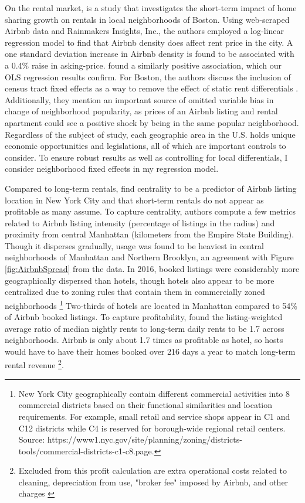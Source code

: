 \documentclass[12pt]{article}
\begin{document}
			\par
			On the rental market, \citet{horn2017home} is a study that investigates the short-term impact of home sharing growth on rentals in local neighborhoods of Boston. Using web-scraped Airbnb data and Rainmakers Insights, Inc., the authors employed a log-linear regression model to find that Airbnb density does affect rent price in the city. A one standard deviation increase in Airbnb density is found to be associated with a 0.4\% raise in asking-price. \citet{barron2018sharing} found a similarly positive association, which our OLS regression results confirm. For Boston, the authors discuss the inclusion of census tract fixed effects as a way to remove the effect of static rent differentials \citep{horn2017home}. Additionally, they mention an important source of omitted variable bias in change of neighborhood popularity, as prices of an Airbnb listing and rental apartment could see a positive shock by being in the same popular neighborhood. Regardless of the subject of study, each geographic area in the U.S. holds unique economic opportunities and legislations, all of which are important controls to consider. To ensure robust results as well as controlling for local differentials, I consider neighborhood fixed effects in my regression model.
			
			\par
			Compared to long-term rentals, \citet{coles2017airbnb} find centrality to be a predictor of Airbnb listing location in New York City and that short-term rentals do not appear as profitable as many assume. To capture centrality, authors compute a few metrics related to Airbnb listing intensity (percentage of listings in the radius) and proximity from central Manhattan (kilometers from the Empire State Building). Though it disperses gradually, usage was found to be heaviest in central neighborhoods of Manhattan and Northern Brooklyn, an agreement with Figure \ref{fig:AirbnbSpread} from the data. In 2016, booked listings were considerably more geographically dispersed than hotels, though hotels also appear to be more centralized due to zoning rules that contain them in commercially zoned neighborhoods \footnote{New York City geographically contain different commercial activities into 8 commercial districts based on their functional similarities and location requirements. For example, small retail and service shops appear in C1 and C12 districts while C4 is reserved for borough-wide regional retail centers. Source: https://www1.nyc.gov/site/planning/zoning/districts-tools/commercial-districts-c1-c8.page.} Two-thirds of hotels are located in Manhattan compared to 54\% of Airbnb booked listings. To capture profitability, \citet{coles2017airbnb} found the listing-weighted average ratio of median nightly rents to long-term daily rents to be 1.7 across neighborhoods. Airbnb is only about 1.7 times as profitable as hotel, so hosts would have to have their homes booked over 216 days a year to match long-term rental revenue \footnote{Excluded from this profit calculation are extra operational costs related to cleaning, depreciation from use, "broker fee" imposed by Airbnb, and other charges \citep{muller2014economic}}.
			
\end{document}
